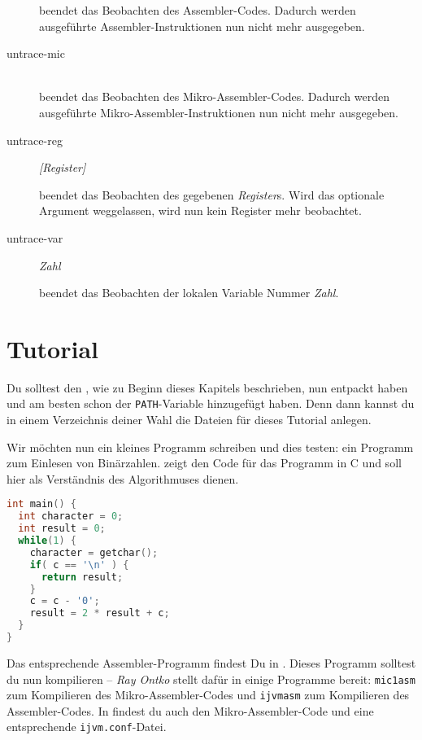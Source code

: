 \begin{description}
  beendet das Beobachten des Assembler-Codes. Dadurch werden ausgeführte Assembler-Instruktionen nun nicht mehr ausgegeben.

\item[untrace-mic] \hspace*{\fill}\\

  beendet das Beobachten des Mikro-Assembler-Codes. Dadurch werden ausgeführte Mikro-Assembler-Instruktionen nun nicht mehr ausgegeben.

\item[untrace-reg] \emph{[Register]}

  beendet das Beobachten des gegebenen \emph{Register}s. Wird das optionale Argument weggelassen, wird nun kein Register mehr beobachtet.

\item[untrace-var] \emph{Zahl}

  beendet das Beobachten der lokalen Variable Nummer \emph{Zahl}.
\end{description}

\section{Tutorial}
Du solltest den \md, wie zu Beginn dieses Kapitels beschrieben, nun entpackt haben und am besten schon der \texttt{PATH}-Variable hinzugefügt haben. Denn dann kannst du in einem Verzeichnis deiner Wahl die Dateien für dieses Tutorial anlegen.

Wir möchten nun ein kleines Programm schreiben und dies testen: ein Programm zum Einlesen von Binärzahlen.  zeigt den Code für das Programm in C und soll hier als Verständnis des Algorithmuses dienen.

\begin{lstlisting}[language=c,caption={C-Programm zum Einlesen einer Binärzahl},label=\lstlbl{binary-read-c}]
int main() {
  int character = 0;
  int result = 0;
  while(1) {
    character = getchar();
    if( c == '\n' ) {
      return result;
    }
    c = c - '0';
    result = 2 * result + c;
  }
}
\end{lstlisting}

Das entsprechende Assembler-Programm findest Du in . Dieses Programm solltest du nun kompilieren -- \emph{Ray Ontko} stellt dafür in \cite{Ontko1999} einige Programme bereit: \texttt{mic1asm} zum Kompilieren des Mikro-Assembler-Codes und \texttt{ijvmasm} zum Kompilieren des Assembler-Codes. In \cite{Ontko1999} findest du auch den Mikro-Assembler-Code und eine entsprechende \texttt{ijvm.conf}-Datei.


